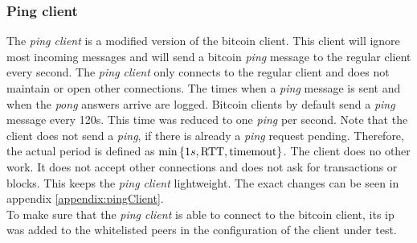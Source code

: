 \subsubsection{Ping client}
The \textit{ping client} is a modified version of the bitcoin client. This client will ignore most incoming messages and will send a bitcoin \textit{ping} message to the regular client every second. The \textit{ping client} only connects to the regular client and does not maintain or open other connections. The times when a \textit{ping} message is sent and when the \textit{pong} answers arrive are logged. Bitcoin clients by default send a \textit{ping} message every 120s. This time was reduced to one \textit{ping} per second. Note that the client does not send a \textit{ping}, if there is already a \textit{ping} request pending. Therefore, the actual period is defined as $\min\left\{ 1s,\mbox{RTT},\mbox{timemout} \right\}$. The client does no other work. It does not accept other connections and does not ask for transactions or blocks. This keeps the \textit{ping client} lightweight. The exact changes can be seen in appendix \ref{appendix:pingClient}.\\
To make sure that the \textit{ping client} is able to connect to the bitcoin client, its ip was added to the whitelisted peers in the configuration of the client under test.

